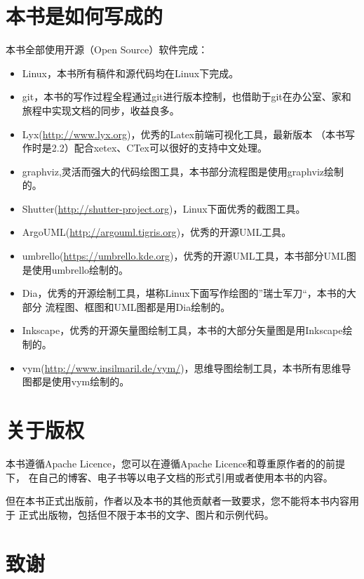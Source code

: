 \section*{本书是如何写成的}
本书全部使用开源（Open Source）软件完成：
\begin{itemize}
    \item Linux，本书所有稿件和源代码均在Linux下完成。
    \item git，本书的写作过程全程通过git进行版本控制，也借助于git在办公室、家和旅程中实现文档的同步，收益良多。
    \item Lyx(\url{http://www.lyx.org})，优秀的Latex前端可视化工具，最新版本
        （本书写作时是2.2）配合xetex、CTex可以很好的支持中文处理。
    \item graphviz,灵活而强大的代码绘图工具，本书部分流程图是使用graphviz绘制的。
    \item Shutter(\url{http://shutter-project.org})，Linux下面优秀的截图工具。
    \item ArgoUML(\url{http://argouml.tigris.org})，优秀的开源UML工具。
    \item umbrello(\url{https://umbrello.kde.org})，优秀的开源UML工具，本书部分UML图是使用umbrello绘制的。
    \item Dia，优秀的开源绘制工具，堪称Linux下面写作绘图的”瑞士军刀“，本书的大部分
        流程图、框图和UML图都是用Dia绘制的。
    \item Inkscape，优秀的开源矢量图绘制工具，本书的大部分矢量图是用Inkscape绘制的。
    \item vym(\url{http://www.insilmaril.de/vym/})，思维导图绘制工具，本书所有思维导图都是使用vym绘制的。
\end{itemize}

\section*{关于版权}
本书遵循Apache Licence，您可以在遵循Apache Licence和尊重原作者的的前提下，
在自己的博客、电子书等以电子文档的形式引用或者使用本书的内容。

但在本书正式出版前，作者以及本书的其他贡献者一致要求，您不能将本书内容用于
正式出版物，包括但不限于本书的文字、图片和示例代码。

\section*{致谢}


